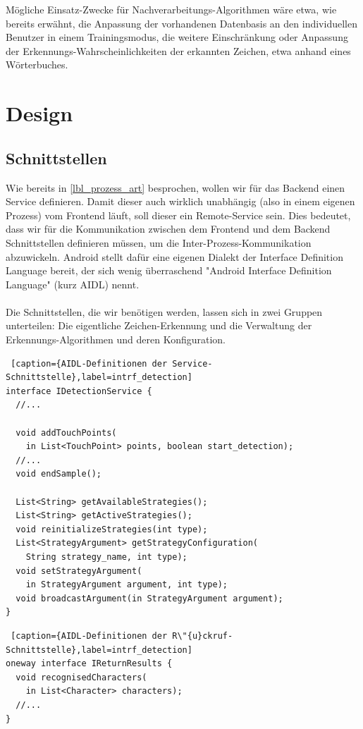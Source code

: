 Mögliche Einsatz-Zwecke für Nachverarbeitungs-Algorithmen wäre etwa, wie bereits erwähnt, die Anpassung der vorhandenen Datenbasis an den individuellen Benutzer in einem Trainingsmodus, die weitere Einschränkung oder Anpassung der Erkennungs-Wahrscheinlichkeiten der erkannten Zeichen, etwa anhand eines Wörterbuches.

\section{Design}

\subsection{Schnittstellen}\label{lbl_be_intrf}

Wie bereits in \ref{lbl_prozess_art} besprochen, wollen wir für das Backend einen Service definieren. Damit dieser auch wirklich unabhängig (also in einem eigenen Prozess) vom Frontend läuft, soll dieser ein Remote-Service sein. Dies bedeutet, dass wir für die Kommunikation zwischen dem Frontend und dem Backend Schnittstellen definieren müssen, um die Inter-Prozess-Kommunikation abzuwickeln. Android stellt dafür eine eigenen Dialekt der Interface Definition Language bereit, der sich wenig überraschend "Android Interface Definition Language" (kurz AIDL) nennt.\\
\\
Die Schnittstellen, die wir benötigen werden, lassen sich in zwei Gruppen unterteilen: Die eigentliche Zeichen-Erkennung und die Verwaltung der Erkennungs-Algorithmen und deren Konfiguration.\\

\begin{lstlisting} [caption={AIDL-Definitionen der Service-Schnittstelle},label=intrf_detection]
interface IDetectionService {
  //...

  void addTouchPoints(
    in List<TouchPoint> points, boolean start_detection);
  //...
  void endSample();

  List<String> getAvailableStrategies();
  List<String> getActiveStrategies();
  void reinitializeStrategies(int type);
  List<StrategyArgument> getStrategyConfiguration(
    String strategy_name, int type);
  void setStrategyArgument(
    in StrategyArgument argument, int type);
  void broadcastArgument(in StrategyArgument argument);
}
\end{lstlisting}
\newpage
\begin{lstlisting} [caption={AIDL-Definitionen der R\"{u}ckruf-Schnittstelle},label=intrf_detection]
oneway interface IReturnResults {
  void recognisedCharacters(
    in List<Character> characters);
  //...
}
\end{lstlisting}


